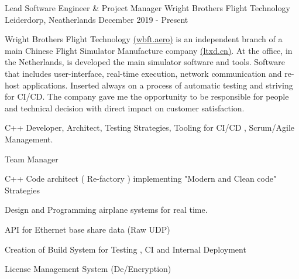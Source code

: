 \begin{cventries}
    \cventry
    {Lead Software Engineer \& Project Manager}
    {Wright Brothers Flight Technology}
    {Leiderdorp, Neatherlands}
    {December 2019 - Present}
    {    
     Wright Brothers Flight Technology \href{https://www.wbft.aero}{(wbft.aero)} is an independent branch of a main Chinese Flight Simulator Manufacture company \href{http://www.ltxd.cn/}{(ltxd.cn)}.\newline
     At the office, in the Netherlands, is developed the main simulator software and tools. Software that includes user-interface, real-time execution, network communication and re-host applications. Inserted always on a process of automatic testing and striving for CI/CD. The company gave me the opportunity to be responsible for people and technical decision with direct impact on customer satisfaction.\newline
     \begin{cvparagraph}
     \vspace{2mm}
      C++ Developer, Architect, Testing Strategies, Tooling for CI/CD ,
     Scrum/Agile Management.\newline 
     \end{cvparagraph}
     \begin{cvparagraph}
      \vspace{5mm}
        \begin{cvitems}
        \item Team Manager
        \item C++ Code architect ( Re-factory ) implementing "Modern and Clean code" Strategies 
        \item Design and Programming airplane systems for real time.
        \item API for Ethernet base share data (Raw UDP)
        \item Creation of Build System for Testing , CI and Internal Deployment
        \item License Management System (De/Encryption)
        \end{cvitems}
    \end{cvparagraph}
    }
  

\end{cventries}

